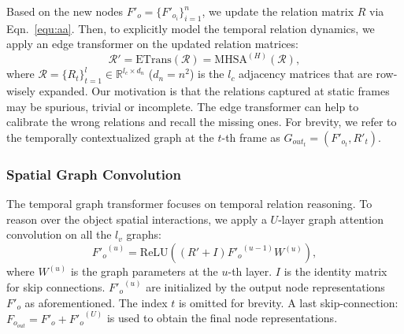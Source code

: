 \documentclass[runningheads]{llncs}
\begin{document}
Based on the new nodes $F'_o=\{F'_{o_i}\}_{i=1}^n$, we  update the relation matrix $R$ via Eqn.~\eqref{equ:aa}. Then, to explicitly model the temporal relation dynamics, we apply an edge transformer on the updated relation matrices: 
\begin{equation}
\label{equ:edge}
    \mathcal{R'} =\text{ETrans}(\mathcal{R}) =\text{MHSA}^{(H)}(\mathcal{R}),
\end{equation}
where $\mathcal{R}\!=\!\{R_t\}_{t=1}^l\in\mathbb{R}^{l_c \times d_n}$ ($d_n=n^2$) is the $l_c$ adjacency matrices that are row-wisely expanded. Our motivation is that the relations captured at static frames may be spurious, trivial or incomplete. The edge transformer can help to calibrate the wrong relations and recall the missing ones. 
For brevity, we refer to the temporally contextualized graph at the $t$-th frame as $G_{out_t}=(F'_{o_t}, R'_t)$. 
\vspace{-0.3cm}

\subsubsection{Spatial Graph Convolution}
The temporal graph transformer focuses on temporal relation reasoning. To reason over the object spatial interactions, we apply a $U$-layer graph attention convolution \cite{kipf2016semi} on all the $l_v$ graphs:
\begin{equation}
\label{equ:gcn}
    {F'_o}^{(u)} = \text{ReLU}((R'+I){F'_o}^{(u-1)}W^{(u)}),
\end{equation}
where $W^{(u)}$ is the graph parameters at the $u$-th layer. $I$ is the identity matrix for skip connections. ${F'_o}^{(u)}$ are initialized by  the output node representations $F'_o$ as aforementioned. The index $t$ is omitted for brevity. A last skip-connection: $F_{o_{out}}=F'_o+{F'_o}^{(U)}$ is used to obtain the final node representations.

\vspace{-0.3cm}
\end{document}
